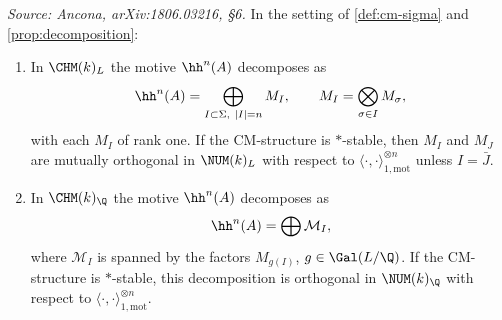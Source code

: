 \begin{proposition}[CM decomposition of \(\hh^n\)]
  \label{prop:cm-decomposition}
  \textit{Source: Ancona, arXiv:1806.03216, §6.}
  In the setting of \cref{def:cm-sigma} and \cref{prop:decomposition}:
  \begin{enumerate}
    \item In \(\CHM(k)_{L}\) the motive \(\hh^n(A)\) decomposes as
      \[\hh^n(A) = \bigoplus_{I \subset \Sigma,\ |I| = n} M_I, \qquad
        M_I = \bigotimes_{\sigma \in I} M_\sigma,\]
      with each \(M_I\) of rank one. If the CM-structure is \(*\)-stable, then
      \(M_I\) and \(M_J\) are mutually orthogonal in \(\NUM(k)_L\) with respect
      to \(\langle \cdot, \cdot \rangle_{1,\mathrm{mot}}^{\otimes n}\) unless
      \(I = \bar J\).
    \item In \(\CHM(k)_{\Q}\) the motive \(\hh^n(A)\) decomposes as
      \[\hh^n(A) = \bigoplus \mathcal{M}_I,\]
      where \(\mathcal{M}_I\) is spanned by the factors \(M_{g(I)}\),
      \(g \in \Gal(L/\Q)\). If the CM-structure is \(*\)-stable, this
      decomposition is orthogonal in \(\NUM(k)_\Q\) with respect to
      \(\langle \cdot, \cdot \rangle_{1,\mathrm{mot}}^{\otimes n}\).
  \end{enumerate}
\end{proposition}

